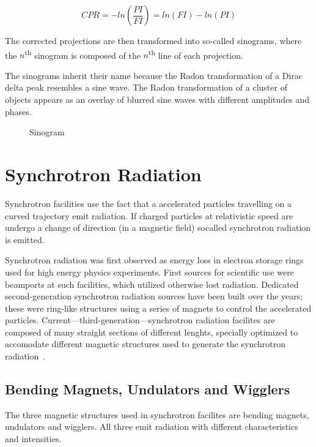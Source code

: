 \begin{equation}
	CPR=-ln\left(\frac{PI}{FI}\right)=ln(FI)-ln(PI)
	\label{eq:cpr}
\end{equation}

The corrected projections are then transformed into so-called sinograms, where the $n$\textsuperscript{th} sinogram is composed of the $n$\textsuperscript{th} line of each projection.

The sinograms inherit their name because the Radon transformation of a Dirac delta peak resembles a sine wave. The Radon transformation of a cluster of objects appears as an overlay of blurred sine waves with different amplitudes and phases.

\begin{figure}
	\caption{Sinogram}
	\label{fig:sinogram}
\end{figure}


\section{Synchrotron Radiation}
Synchrotron facilities use the fact that a accelerated particles travelling on a curved trajectory emit radiation. If charged particles at relativistic speed are undergo a change of direction (\ie in a magnetic field) socalled synchrotron radiation is emitted. 

Synchrotron radiation was first observed as energy loss in electron storage rings used for high energy physics experiments. First sources for scientific use were beamports at such facilities, which utilized otherwise lost radiation. Dedicated second-generation synchrotron radiation sources have been built over the years; these were ring-like structures using a series of magnets to control the accelerated particles. Current---third-generation---synchrotron radiation facilites are composed of many straight sections of different lenghts, specially optimized to accomodate different magnetic structures used to generate the synchrotron radiation~\cite{Stampanoni2002a,Margaritondo2002,wwwsls}. 

\subsection{Bending Magnets, Undulators and Wigglers}
The three magnetic structures used in synchrotron facilites are bending magnets, undulators and wigglers. All three emit radiation with different characteristics and intensities.

